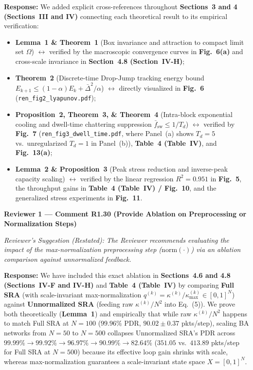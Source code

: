 \documentclass[11pt,a4paper]{article}
\newcommand{\cbox}[2]{%
  \vspace{0.6em}\noindent\textbf{#1}\par\smallskip
  \noindent\textit{Reviewer's Suggestion (Restated):} \textit{#2}\par\smallskip
}
\begin{document}
\noindent\textbf{Response:} We added explicit cross-references throughout \textbf{Sections~3 and 4 (Sections~III and IV)} connecting each theoretical result to its empirical verification:
\begin{itemize}[leftmargin=1.8em]
    \item \textbf{Lemma~1 \& Theorem~1} (Box invariance and attraction to compact limit set $\Omega$) $\leftrightarrow$ verified by the macroscopic convergence curves in \textbf{Fig.~6(a)} and cross-scale invariance in \textbf{Section~4.8 (Section~IV-H)};
    \item \textbf{Theorem~2} (Discrete-time Drop-Jump tracking energy bound $E_{k+1} \le (1-\alpha)E_k + \bar{\Delta}^2/\alpha$) $\leftrightarrow$ directly visualized in \textbf{Fig.~6} (\texttt{ren\_fig2\_lyapunov.pdf});
    \item \textbf{Proposition~2, Theorem~3, \& Theorem~4} (Intra-block exponential cooling and dwell-time chattering suppression $\bar{f}_{\text{sw}} \le 1/T_d$) $\leftrightarrow$ verified by \textbf{Fig.~7} (\texttt{ren\_fig3\_dwell\_time.pdf}, where Panel~(a) shows $T_d=5$ vs.\ unregularized $T_d=1$ in Panel~(b)), \textbf{Table~4 (Table~IV)}, and \textbf{Fig.~13(a)};
    \item \textbf{Lemma~2 \& Proposition~3} (Peak stress reduction and inverse-peak capacity scaling) $\leftrightarrow$ verified by the linear regression $R^2=0.951$ in \textbf{Fig.~5}, the throughput gains in \textbf{Table~4 (Table~IV) / Fig.~10}, and the generalized stress experiments in \textbf{Fig.~11}.
\end{itemize}

\hrulefill

\cbox{Reviewer 1 --- Comment R1.30 (Provide Ablation on Preprocessing or Normalization Steps)}{The Reviewer recommends evaluating the impact of the max-normalization preprocessing step ($\mathrm{norm}(\cdot)$) via an ablation comparison against unnormalized feedback.}

\noindent\textbf{Response:} We have included this exact ablation in \textbf{Sections~4.6 and 4.8 (Sections~IV-F and IV-H)} and \textbf{Table~4 (Table~IV)} by comparing \textbf{Full SRA} (with scale-invariant max-normalization $q^{(k)} = \kappa^{(k)}/\kappa_{\max}^{(k)} \in [0,1]^N$) against \textbf{Unnormalized SRA} (feeding raw $\kappa^{(k)}/N^2$ into Eq.~(5)). We prove both theoretically (\textbf{Lemma~1}) and empirically that while raw $\kappa^{(k)}/N^2$ happens to match Full SRA at $N=100$ ($99.96\%$ PDR, $90.02 \pm 0.37$ pkts/step), scaling BA networks from $N=50$ to $N=500$ collapses Unnormalized SRA's PDR across $99.99\% \to 99.92\% \to 96.97\% \to 90.99\% \to \mathbf{82.64\%}$ ($351.05$ vs.\ $413.89$ pkts/step for Full SRA at $N=500$) because its effective loop gain shrinks with scale, whereas max-normalization guarantees a scale-invariant state space $X=[0,1]^N$.
\end{document}
